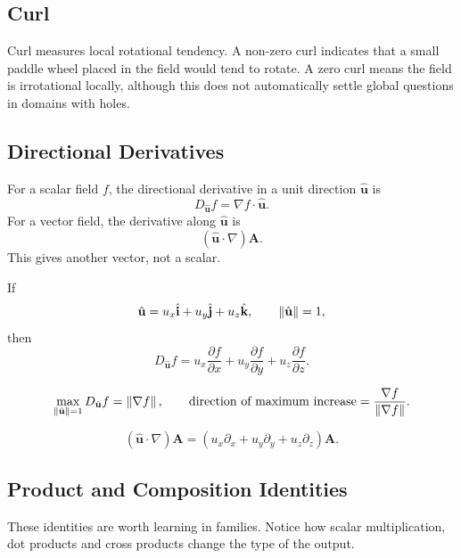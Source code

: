 \documentclass{otscience}
\begin{document}
\subsection{Curl}

Curl measures local rotational tendency. A non-zero curl indicates that a small paddle wheel placed in the field would tend to rotate. A zero curl means the field is irrotational locally, although this does not automatically settle global questions in domains with holes.

\subsection{Directional Derivatives}

For a scalar field \(f\), the directional derivative in a unit direction \(\hat{\mathbf{u}}\) is
\[
    D_{\hat{\mathbf{u}}}f=\nabla f\cdot\hat{\mathbf{u}}.
\]
For a vector field, the derivative along \(\hat{\mathbf{u}}\) is
\[
    (\hat{\mathbf{u}}\cdot\nabla)\mathbf{A}.
\]
This gives another vector, not a scalar.

\begin{formulaboxnosplit}
    If
    \[
        \hat{\mathbf{u}}=u_x\hat{\mathbf{i}}+u_y\hat{\mathbf{j}}+u_z\hat{\mathbf{k}},\qquad \left\lVert\hat{\mathbf{u}}\right\rVert=1,
    \]
    then
    \[
        D_{\hat{\mathbf{u}}}f=u_x\frac{\partial f}{\partial x}+u_y\frac{\partial f}{\partial y}+u_z\frac{\partial f}{\partial z}.
    \]

    \[
        \max_{\left\lVert\hat{\mathbf{u}}\right\rVert=1}D_{\hat{\mathbf{u}}}f=\left\lVert\nabla f\right\rVert,
        \qquad
        \text{direction of maximum increase}=\frac{\nabla f}{\left\lVert\nabla f\right\rVert}.
    \]

    \[
        (\hat{\mathbf{u}}\cdot\nabla)\mathbf{A}=
        \left(u_x\partial_x+u_y\partial_y+u_z\partial_z\right)\mathbf{A}.
    \]
\end{formulaboxnosplit}

\subsection{Product and Composition Identities}

These identities are worth learning in families. Notice how scalar multiplication, dot products and cross products change the type of the output.
\end{document}
